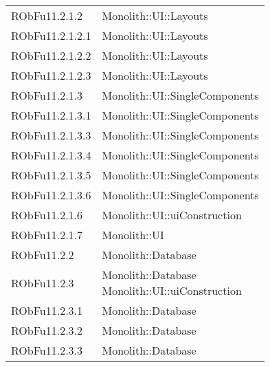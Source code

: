 \begin{center}
\begin{longtable}{|
*{1}{>{\centering\arraybackslash}m{2.5cm}|}
*{1}{>{\centering\arraybackslash}m{7.5cm}|}}
{\\}\\\hline
RObFu11.2.1.2 & \makecell[l]{Monolith::UI::Layouts
\\}\\\hline
RObFu11.2.1.2.1 & \makecell[l]{Monolith::UI::Layouts
\\}\\\hline
RObFu11.2.1.2.2 & \makecell[l]{Monolith::UI::Layouts
\\}\\\hline
RObFu11.2.1.2.3 & \makecell[l]{Monolith::UI::Layouts
\\}\\\hline
RObFu11.2.1.3 & \makecell[l]{Monolith::UI::SingleComponents
\\}\\\hline
RObFu11.2.1.3.1 & \makecell[l]{Monolith::UI::SingleComponents
\\}\\\hline
RObFu11.2.1.3.3 & \makecell[l]{Monolith::UI::SingleComponents
\\}\\\hline
RObFu11.2.1.3.4 & \makecell[l]{Monolith::UI::SingleComponents
\\}\\\hline
RObFu11.2.1.3.5 & \makecell[l]{Monolith::UI::SingleComponents
\\}\\\hline
RObFu11.2.1.3.6 & \makecell[l]{Monolith::UI::SingleComponents
\\}\\\hline
RObFu11.2.1.6 & \makecell[l]{Monolith::UI::uiConstruction
\\}\\\hline
RObFu11.2.1.7 & \makecell[l]{Monolith::UI
\\}\\\hline
RObFu11.2.2 & \makecell[l]{Monolith::Database
\\}\\\hline
RObFu11.2.3 & \makecell[l]{Monolith::Database
\\Monolith::UI::uiConstruction
\\}\\\hline
RObFu11.2.3.1 & \makecell[l]{Monolith::Database
\\}\\\hline
RObFu11.2.3.2 & \makecell[l]{Monolith::Database
\\}\\\hline
RObFu11.2.3.3 & \makecell[l]{Monolith::Database
\\}\\\hline

\end{longtable}
\end{center}
